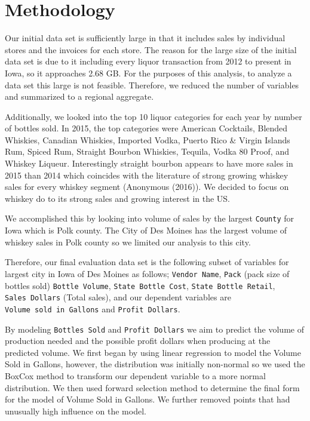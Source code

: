 \documentclass[]{elsarticle} %
\begin{document}
\section{Methodology}\label{methodology}

Our initial data set is sufficiently large in that it includes sales by
individual stores and the invoices for each store. The reason for the
large size of the initial data set is due to it including every liquor
transaction from 2012 to present in Iowa, so it approaches 2.68 GB. For
the purposes of this analysis, to analyze a data set this large is not
feasible. Therefore, we reduced the number of variables and summarized
to a regional aggregate.

Additionally, we looked into the top 10 liquor categories for each year
by number of bottles sold. In 2015, the top categories were American
Cocktails, Blended Whiskies, Canadian Whiskies, Imported Vodka, Puerto
Rico \& Virgin Islands Rum, Spiced Rum, Straight Bourbon Whiskies,
Tequila, Vodka 80 Proof, and Whiskey Liqueur. Interestingly straight
bourbon appears to have more sales in 2015 than 2014 which coincides
with the literature of strong growing whiskey sales for every whiskey
segment (Anonymous (2016)). We decided to focus on whiskey do to its
strong sales and growing interest in the US.

We accomplished this by looking into volume of sales by the largest
\texttt{County} for Iowa which is Polk county. The City of Des Moines
has the largest volume of whiskey sales in Polk county so we limited our
analysis to this city.

Therefore, our final evaluation data set is the following subset of
variables for largest city in Iowa of Des Moines as follows;
\texttt{Vendor\ Name}, \texttt{Pack} (pack size of bottles sold)
\texttt{Bottle\ Volume}, \texttt{State\ Bottle\ Cost},
\texttt{State\ Bottle\ Retail}, \texttt{Sales\ Dollars} (Total sales),
and our dependent variables are \texttt{Volume\ sold\ in\ Gallons} and
\texttt{Profit\ Dollars}.

By modeling \texttt{Bottles\ Sold} and \texttt{Profit\ Dollars} we aim
to predict the volume of production needed and the possible profit
dollars when producing at the predicted volume. We first began by using
linear regression to model the Volume Sold in Gallons, however, the
distribution was initially non-normal so we used the BoxCox method to
transform our dependent variable to a more normal distribution. We then
used forward selection method to determine the final form for the model
of Volume Sold in Gallons. We further removed points that had unusually
high influence on the model.
\end{document}
